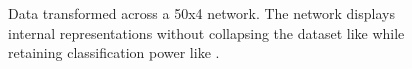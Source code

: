 \begin{figure}
{{    }
  }

    \caption{Data transformed across a 50x4 \SepUnitPoint network. The network displays internal representations without collapsing the dataset like \SepPoint while retaining classification power like \SepUnit.}
    \label{fig:moonsUnitPointwise}
\end{figure}

\begin{figure}
  \centering
  \parbox{\textwidth}{
    \parbox{.195\textwidth}{%
    }
    \parbox{.195\textwidth}{%
}}
\end{figure}

